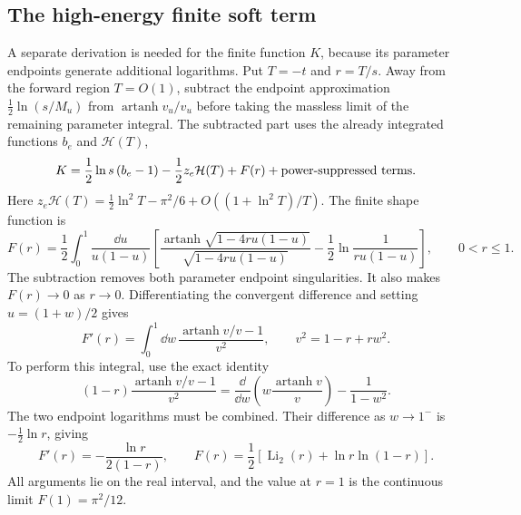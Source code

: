 \subsection{The high-energy finite soft term}
A separate derivation is needed for the finite function $K$, because its
parameter endpoints generate additional logarithms.  Put $T=-t$ and
$r=T/s$.  Away from the forward region $T=O(1)$, subtract the endpoint
approximation
$\tfrac12\ln(s/M_u)$ from $\operatorname{artanh}v_u/v_u$ before taking
the massless limit of the remaining parameter integral.  The subtracted
part uses the already integrated functions $b_e$ and $\mathcal H(T)$,
\begin{equation}
 K=\frac12\ln s\,(b_e-1)-\frac12z_e\mathcal H(T)+F(r)
                     +\hbox{power-suppressed terms}.
\end{equation}
Here $z_e\mathcal H(T)=\tfrac12\ln^2T-\pi^2/6+
O((1+\ln^2T)/T)$.  The finite shape function is
\begin{equation}
 F(r)=\frac12\int_0^1\frac{\dd u}{u(1-u)}
 \left[\frac{\operatorname{artanh}\sqrt{1-4ru(1-u)}}
                  {\sqrt{1-4ru(1-u)}}
       -\frac12\ln\frac1{ru(1-u)}\right],\qquad 0<r\leq1.
\end{equation}
The subtraction removes both parameter endpoint singularities.  It also
makes $F(r)\to0$ as $r\to0$.  Differentiating the convergent difference
and setting $u=(1+w)/2$ gives
\begin{equation}
 F'(r)=\int_0^1\dd w\,
 \frac{\operatorname{artanh}v/v-1}{v^2},\qquad
 v^2=1-r+rw^2.
\end{equation}
To perform this integral, use the exact identity
\begin{equation}
 (1-r)\frac{\operatorname{artanh}v/v-1}{v^2}
 =\frac{\dd}{\dd w}\left(w\frac{\operatorname{artanh}v}{v}\right)
                         -\frac1{1-w^2}.
\end{equation}
The two endpoint logarithms must be combined.  Their difference as
$w\to1^-$ is $-\tfrac12\ln r$, giving
\begin{equation}
 F'(r)=-\frac{\ln r}{2(1-r)},\qquad
 F(r)=\frac12\left[\operatorname{Li}_2(r)+\ln r\ln(1-r)\right].
\end{equation}
All arguments lie on the real interval, and the value at $r=1$ is the
continuous limit $F(1)=\pi^2/12$.

